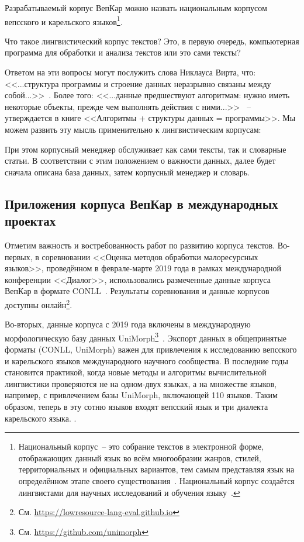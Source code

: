 Разрабатываемый корпус ВепКар можно назвать национальным корпусом 
вепсского и карельского языков\footnote{ Национальный корпус~-- это собрание текстов 
в электронной форме, 
отображающих данный язык во всём многообразии жанров, стилей, территориальных и официальных вариантов, 
тем самым представляя язык на определённом этапе своего существования~\cite[с.~418]{Kibrik2019}. 
Национальный корпус создаётся лингвистами для научных исследований и обучения языку~\cite[с.~419]{Kibrik2019}.
}.

Что такое лингвистический корпус текстов? Это, в первую очередь, компьютерная программа для обработки и анализа текстов или это сами тексты? 

Ответом на эти вопросы могут послужить слова Никлауса Вирта, что: 
<<...структура программы и строение данных неразрывно связаны между собой...>>~\cite[с.~9]{Wirth1989AlgorithmsAndDataStructure}. 
Более того:   
<<...данные предшествуют алгоритмам: нужно иметь некоторые объекты, 
прежде чем выполнять действия с ними...>>~\cite[с.~8]{Wirth1985Algorithms+} 
-- утверждается в книге <<Алгоритмы + структуры данных = программы>>.
Мы можем развить эту мысль применительно к лингвистическим корпусам:
        

\noindent
При этом корпусный менеджер обслуживает как сами тексты, так и словарные статьи. 
В соответствии с этим положением о важности данных, далее будет  
сначала описана база данных, затем корпусный менеджер и словарь.



\subsection{Приложения корпуса ВепКар в международных проектах} \label{sect_VepKar_international}


Отметим важность и востребованность работ по развитию корпуса текстов. 
Во-первых, в соревновании <<Оценка методов обработки малоресурсных языков>>, 
проведённом в феврале-марте 2019 года 
в рамках международной конференции <<Диалог>>, 
использовались размеченные данные корпуса ВепКар 
в формате CONLL~\cite{Klyachko2019LowresourceEval}. 
Результаты соревнования и данные корпусов 
доступны онлайн\footnote{См. \url{https://lowresource-lang-eval.github.io}}.

Во-вторых, данные корпуса с 2019 года включены 
в международную морфологическую базу данных 
UniMorph\footnote{См. \url{https://github.com/unimorph}}~\cite{McCarthy2020Unimorph}. 
Экспорт данных в общепринятые форматы (CONLL, UniMorph) 
важен для привлечения к исследованию вепсского и карельского языков 
международного научного сообщества. 
В последние годы становится практикой, 
когда новые методы и алгоритмы вычислительной лингвистики 
проверяются не на одном-двух языках, 
а на множестве языков, например, с привлечением базы UniMorph, включающей 110 языков. 
Таким образом, теперь в эту сотню языков входят вепсский язык и три диалекта карельского языка. 
.

